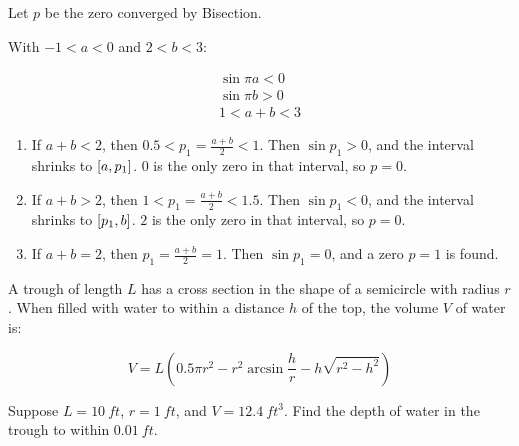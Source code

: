 \documentclass[../../../../Assignments.tex]{subfiles}
\begin{document}
\begin{solution}
    Let \(p\) be the zero converged by Bisection.

    With \(-1 < a < 0\) and \(2 < b < 3\):

    \begin{gather*}
        \sin{\pi a} < 0 \\
        \sin{\pi b} > 0 \\
        1 < a + b < 3
    \end{gather*}

    \begin{enumerate}[label = (\alph*)]
        \item If \(a + b < 2\), then \(\num{0.5} < p_1 = \frac{a + b}{2} < 1\).
            Then \(\sin{p_1} > 0\), and the interval shrinks to
            \(\interval{a}{p_1}\). \(0\) is the only zero in that interval, so
            \(p = 0\).

        \item If \(a + b > 2\), then \(1 < p_1 = \frac{a + b}{2} < \num{1.5}\).
            Then \(\sin{p_1} < 0\), and the interval shrinks to
            \(\interval{p_1}{b}\). \(2\) is the only zero in that interval, so
            \(p = 0\).

        \item If \(a + b = 2\), then \(p_1 = \frac{a + b}{2} = 1\). Then
            \(\sin{p_1} = 0\), and a zero \(p = 1\) is found.
    \end{enumerate}
\end{solution}

\begin{exercise}
    A trough of length \(L\) has a cross section in the shape of a semicircle
    with radius \(r\). When filled with water to within a distance \(h\) of the
    top, the volume \(V\) of water is:

    \[V = L (\num{0.5} \pi r^2 - r^2 \arcsin{\frac{h}{r}} - h \sqrt{r^2 - h^2})\]

    Suppose \(L = \SI{10}{ft}\), \(r = \SI{1}{ft}\), and \(V =
    \SI{12.4}{ft^3}\). Find the depth of water in the trough to within
    \(\SI{0.01}{ft}\).
\end{exercise}
\end{document}
